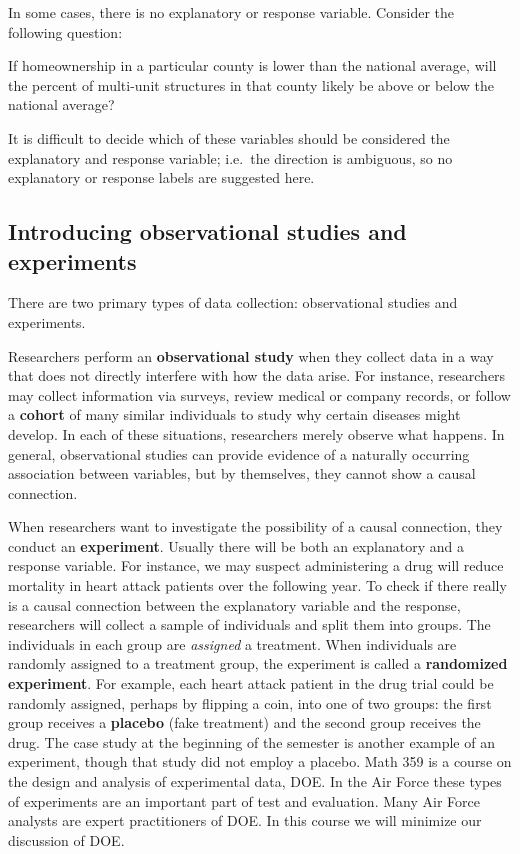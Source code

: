 \documentclass[
]{book}
\begin{document}
In some cases, there is no explanatory or response variable. Consider the following question:

If homeownership in a particular county is lower than the national average, will the percent of multi-unit structures in that county likely be above or below the national average?

It is difficult to decide which of these variables should be considered the explanatory and response variable; i.e.~the direction is ambiguous, so no explanatory or response labels are suggested here.

\hypertarget{introducing-observational-studies-and-experiments}{%
\subsection{Introducing observational studies and experiments}\label{introducing-observational-studies-and-experiments}}

There are two primary types of data collection: observational studies and experiments.

Researchers perform an \textbf{observational study} when they collect data in a way that does not directly interfere with how the data arise. For instance, researchers may collect information via surveys, review medical or company records, or follow a \textbf{cohort} of many similar individuals to study why certain diseases might develop. In each of these situations, researchers merely observe what happens. In general, observational studies can provide evidence of a naturally occurring association between variables, but by themselves, they cannot show a causal connection.

When researchers want to investigate the possibility of a causal connection, they conduct an \textbf{experiment}. Usually there will be both an explanatory and a response variable. For instance, we may suspect administering a drug will reduce mortality in heart attack patients over the following year. To check if there really is a causal connection between the explanatory variable and the response, researchers will collect a sample of individuals and split them into groups. The individuals in each group are \emph{assigned} a treatment. When individuals are randomly assigned to a treatment group, the experiment is called a \textbf{randomized experiment}. For example, each heart attack patient in the drug trial could be randomly assigned, perhaps by flipping a coin, into one of two groups: the first group receives a \textbf{placebo} (fake treatment) and the second group receives the drug. The case study at the beginning of the semester is another example of an experiment, though that study did not employ a placebo. Math 359 is a course on the design and analysis of experimental data, DOE. In the Air Force these types of experiments are an important part of test and evaluation. Many Air Force analysts are expert practitioners of DOE. In this course we will minimize our discussion of DOE.
\end{document}
